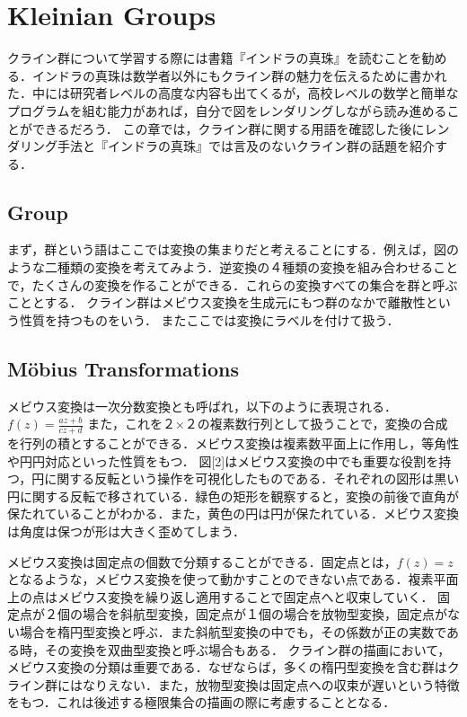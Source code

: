 
\section{Kleinian Groups}
クライン群について学習する際には書籍『インドラの真珠』\cite{indra}を読むことを勧める．インドラの真珠は数学者以外にもクライン群の魅力を伝えるために書かれた．中には研究者レベルの高度な内容も出てくるが，高校レベルの数学と簡単なプログラムを組む能力があれば，自分で図をレンダリングしながら読み進めることができるだろう．
この章では，クライン群に関する用語を確認した後にレンダリング手法と『インドラの真珠』では言及のないクライン群の話題を紹介する．

\subsection{Group}
まず，群という語はここでは変換の集まりだと考えることにする．例えば，図のような二種類の変換を考えてみよう．逆変換の４種類の変換を組み合わせることで，たくさんの変換を作ることができる．これらの変換すべての集合を群と呼ぶこととする．
クライン群はメビウス変換を生成元にもつ群のなかで離散性という性質を持つものをいう．
またここでは変換にラベルを付けて扱う．

\subsection{M\"obius Transformations}
メビウス変換は一次分数変換とも呼ばれ，以下のように表現される．
$f(z) = \frac{az + b}{cz + d}$
また，これを２×２の複素数行列として扱うことで，変換の合成を行列の積とすることができる．メビウス変換は複素数平面上に作用し，等角性や円円対応といった性質をもつ．
図[2]はメビウス変換の中でも重要な役割を持つ，円に関する反転という操作を可視化したものである．それぞれの図形は黒い円に関する反転で移されている．緑色の矩形を観察すると，変換の前後で直角が保たれていることがわかる．また，黄色の円は円が保たれている．メビウス変換は角度は保つが形は大きく歪めてしまう．

メビウス変換は固定点の個数で分類することができる．固定点とは，$f(z) = z$となるような，メビウス変換を使って動かすことのできない点である．複素平面上の点はメビウス変換を繰り返し適用することで固定点へと収束していく．
固定点が２個の場合を斜航型変換，固定点が１個の場合を放物型変換，固定点がない場合を楕円型変換と呼ぶ．また斜航型変換の中でも，その係数が正の実数である時，その変換を双曲型変換と呼ぶ場合もある．
クライン群の描画において，メビウス変換の分類は重要である．なぜならば，多くの楕円型変換を含む群はクライン群にはなりえない．また，放物型変換は固定点への収束が遅いという特徴をもつ．これは後述する極限集合の描画の際に考慮することとなる．

